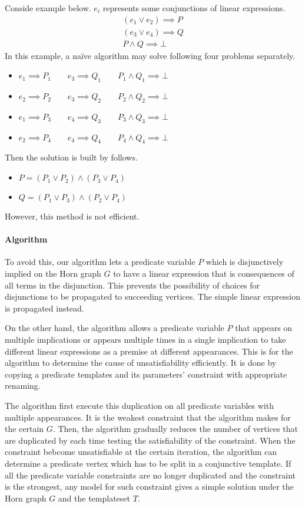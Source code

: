 \documentclass[a4paper,12pt]{article}
\begin{document}
Conside example below. $e_i$ represents some conjunctions of linear
expressions.
\begin{align*}
(e_1 \vee e_2) \implies P \\ (e_3 \vee e_4) \implies Q \\ P \wedge Q \implies \bot
\end{align*}
In this example, a na\"{i}ve algorithm may solve following four
problems separately.
\begin{itemize}
\item $e_1 \implies P_1 \qquad e_3 \implies Q_1 \qquad P_1 \wedge Q_1 \implies \bot$
\item $e_2 \implies P_2 \qquad e_3 \implies Q_2 \qquad P_2 \wedge Q_2 \implies \bot$
\item $e_1 \implies P_3 \qquad e_4 \implies Q_3 \qquad P_3 \wedge Q_3 \implies \bot$
\item $e_2 \implies P_4 \qquad e_4 \implies Q_4 \qquad P_4 \wedge Q_4 \implies \bot$
\end{itemize}
Then the solution is built by follows.
\begin{itemize}
\item $P = ( P_1 \vee P_2 ) \wedge ( P_3 \vee P_4 )$
\item $Q = ( P_1 \vee P_3 ) \wedge ( P_2 \vee P_4 )$
\end{itemize}
However, this method is not efficient.

\paragraph{Algorithm}
To avoid this, our algorithm lets a predicate variable $P$ which is
disjunctively implied on the Horn graph $G$ to have a linear
expression that is consequences of all terms in the disjunction.  This
prevents the possibility of choices for disjunctions to be propagated
to succeeding vertices. The simple linear expression is propagated
instead.

On the other hand, the algorithm allows a predicate variable $P$ that
appears on multiple implications or appears multiple times in a single
implication to take different linear expressions as a premise at
different appearances.  This is for the algorithm to determine the
cause of unsatisfiability efficiently.  It is done by copying a
predicate templates and its parameters' constraint with appropriate
renaming.

The algorithm first execute this duplication on all predicate
variables with multiple appearances.  It is the weakest constraint
that the algorithm makes for the certain $G$.  Then, the algorithm
gradually reduces the number of vertices that are duplicated by each
time testing the satisfiability of the constraint.  When the
constraint bebcome unsatisfiable at the certain iteration, the
algorithm can determine a predicate vertex which has to be split in a
conjunctive template.  If all the predicate variable constraints are
no longer duplicated and the constraint is the strongest, any model
for such constraint gives a simple solution under the Horn graph $G$
and the templateset $T$.
\end{document}
